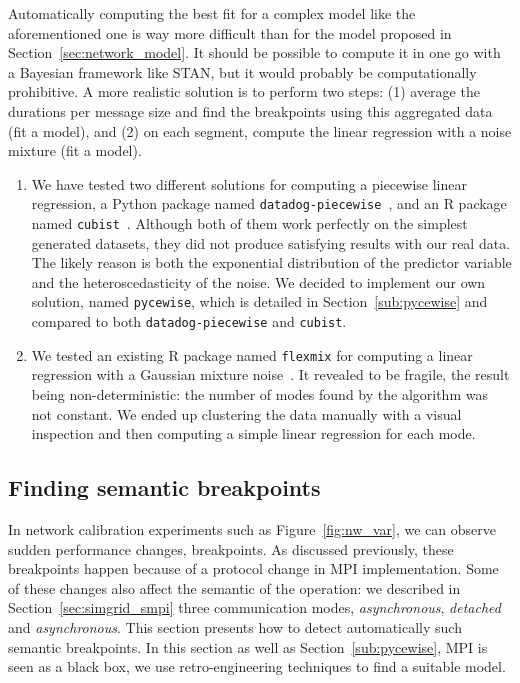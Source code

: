             Automatically computing the best fit for a complex model like the aforementioned one is way more difficult
            than for the \dgemm model proposed in Section~\ref{sec:network_model}. It should be possible to compute it
            in one go with a Bayesian framework like STAN, but it would probably be computationally prohibitive. A more
            realistic solution is to perform two steps: (1) average the durations per message size and find the
            breakpoints using this aggregated data (\ie fit a  model), and (2) on each segment,
            compute the linear regression with a noise mixture (\ie fit a  model).
            \begin{enumerate}
                \item We have tested two different solutions for computing a piecewise linear regression, a Python
                    package named \texttt{datadog-piecewise}~\cite{datadog}, and an R package named
                    \texttt{cubist}~\cite{cubist}.  Although both of them work perfectly on the simplest generated
                    datasets, they did not produce satisfying results with our real data. The likely reason is both the
                    exponential distribution of the predictor variable and the heteroscedasticity of the noise. We
                    decided to implement our own solution, named \texttt{pycewise}, which is detailed in
                    Section~\ref{sub:pycewise} and compared to both \texttt{datadog-piecewise} and \texttt{cubist}.
                \item We tested an existing R package named \texttt{flexmix} for computing a linear regression with a
                    Gaussian mixture noise~\cite{flexmix}. It revealed to be fragile, the result being
                    non-deterministic: the number of modes found by the algorithm was not constant. We ended up
                    clustering the data manually with a visual inspection and then computing a simple linear regression
                    for each mode.
            \end{enumerate}

        \subsection{Finding semantic breakpoints}%
        \label{sub:finding_semantic_breakpoints}

            In network calibration experiments such as Figure~\ref{fig:nw_var}, we can observe sudden performance
            changes, \aka breakpoints. As discussed previously, these breakpoints happen because of a protocol change in
            MPI implementation. Some of these changes also affect the semantic of the \send operation: we described in
            Section~\ref{sec:simgrid_smpi} three communication modes, \emph{asynchronous}, \emph{detached} and
            \emph{asynchronous}. This section presents how to detect automatically such semantic breakpoints.  In this
            section as well as Section~\ref{sub:pycewise}, MPI is seen as a black box, we use retro-engineering
            techniques to find a suitable model.


